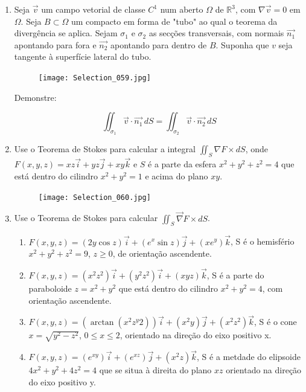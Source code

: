 \documentclass[11pt,a4paper]{article}
\begin{document}
\begin{enumerate}
	\item Seja $\vec{v}$ um campo vetorial de classe $C^1$ num aberto $\Omega$ de $\mathbb{R}^3$, com $\nabla \vec{v} = 0$ em $\Omega$. Seja $B \subset \Omega$ um compacto em forma de "tubo" ao qual o teorema da divergência se aplica. Sejam $\sigma_1$ e $\sigma_2$ as secções transversais, com normais $\vec{n_1}$ apontando para fora e $\vec{n_2}$ apontando para dentro de $B$. Suponha que $v$ seja tangente à superfície lateral do tubo. 
	
\begin{figure}[h]	
\centering %
\texttt{[image: Selection\_059.jpg]} 
\end{figure}

Demonstre: 

$$\displaystyle\iint_{\sigma_1} \vec{v} \cdot \vec{n_1} \, dS = \displaystyle\iint_{\sigma_2} \vec{v} \cdot \vec{n_2} \, dS$$

\item Use o Teorema de Stokes para calcular a integral $\displaystyle\iint_S \nabla F \times  dS$, onde $F(x,y,z) = xz\vec{i} + yz\vec{j} + xy\vec{k}$ e $S$ é a parte da esfera $x^2 + y^2 + z^2 = 4$ que está dentro do cilindro $x^2 + y^2 = 1$ e acima do plano $xy$. 

\begin{figure}[h]	
\centering %
\texttt{[image: Selection\_060.jpg]} 
\end{figure}

\item Use o Teorema de Stokes para calcular $\displaystyle\iint_S \vec{\nabla} F \times  dS$.

\begin{enumerate}
\item $F(x,y,z) = (2y \cos z) \vec{i} + (e^x\sin z) \vec{j} + (xe^y) \vec{k}$, S é o hemisfério $x^2 + y^2 + z^2 = 9$, $z \geq 0$, de orientação ascendente. 
\item $F(x,y,z) = (x^2z^2)\vec{i} + (y^2z^2)\vec{i} + (xyz)\vec{k}$, S é a parte do paraboloide $z = x^2 + y^2$ que está dentro do cilindro $x^2 + y^2 = 4$, com orientação ascendente. 

\item $F(x,y,z) = (\arctan (x^2z^y2))\vec{i} + (x^2y)\vec{j} + (x^2z^2)\vec{k}$, S é o cone $x = \sqrt{y^2 - z^2}$, $0 \leq x \leq 2$, orientado na direção do eixo positivo x. 
\item $F(x,y,z) = (e^{xy})\vec{i} + (e^{xz})\vec{j} + (x^2z)\vec{k}$, S é a metdade do elipsoide $4x^2 + y^2 + 4z^2 = 4$ que se situa à direita do plano $xz$ orientado na direção do eixo positivo y. 
\end{enumerate}


\end{enumerate}
\end{document}
